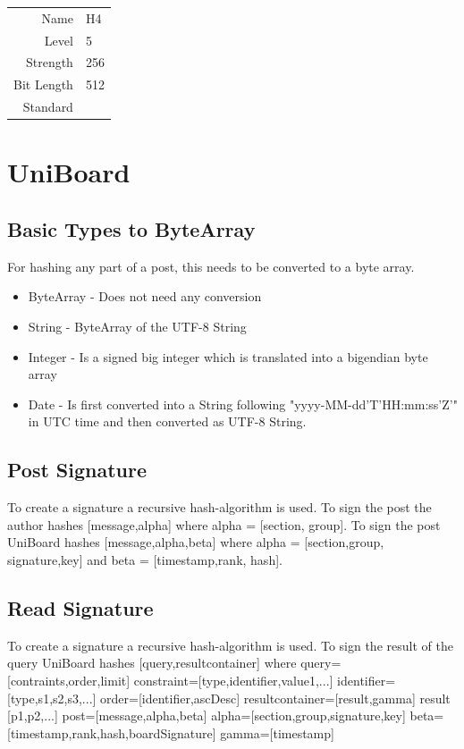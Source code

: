 \documentclass[bibtotoc,halfparskip,oneside]{scrreprt}
\begin{document}
	\begin{tabularx}{\textwidth}{rX}
		Name & \textsf{H4} \\
		Level & 5 \\
		Strength & 256 \\
		Bit Length & 512 \\
		Standard & 
	\end{tabularx}
	
	
	\chapter{UniBoard}
	
	\section{Basic Types to ByteArray}
	For hashing any part of a post, this needs to be converted to a byte array.
	\begin{itemize}
		\item ByteArray - Does not need any conversion
		\item String - ByteArray of the UTF-8 String
		\item Integer - Is a signed big integer which is translated into a bigendian byte array
		\item Date - Is first converted into a String following "yyyy-MM-dd'T'HH:mm:ss'Z'" in UTC time and then converted as UTF-8 String.
	\end{itemize}
	\section{Post Signature}
	To create a signature a recursive hash-algorithm is used.
	To sign the post the author hashes [message,alpha] where alpha  = [section, group].
	To sign the post UniBoard  hashes [message,alpha,beta] where alpha = [section,group, signature,key] and
	beta = [timestamp,rank, hash].
	\section{Read Signature}
	To create a signature a recursive hash-algorithm is used.
	To sign the result of the query UniBoard hashes [query,resultcontainer] where query=[contraints,order,limit]
	constraint=[type,identifier,value1,...] identifier=[type,s1,s2,s3,...] order=[identifier,ascDesc] resultcontainer=[result,gamma]
	result [p1,p2,...] post=[message,alpha,beta] alpha=[section,group,signature,key] beta=[timestamp,rank,hash,boardSignature] gamma=[timestamp]
	
\end{document}
